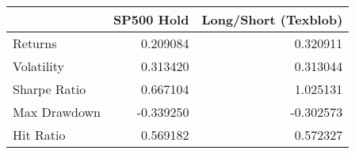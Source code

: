 \begin{tabular}{lrr}
\toprule
{} &  SP500 Hold &  Long/Short (Texblob) \\
\midrule
Returns      &    0.209084 &              0.320911 \\
Volatility   &    0.313420 &              0.313044 \\
Sharpe Ratio &    0.667104 &              1.025131 \\
Max Drawdown &   -0.339250 &             -0.302573 \\
Hit Ratio    &    0.569182 &              0.572327 \\
\bottomrule
\end{tabular}
